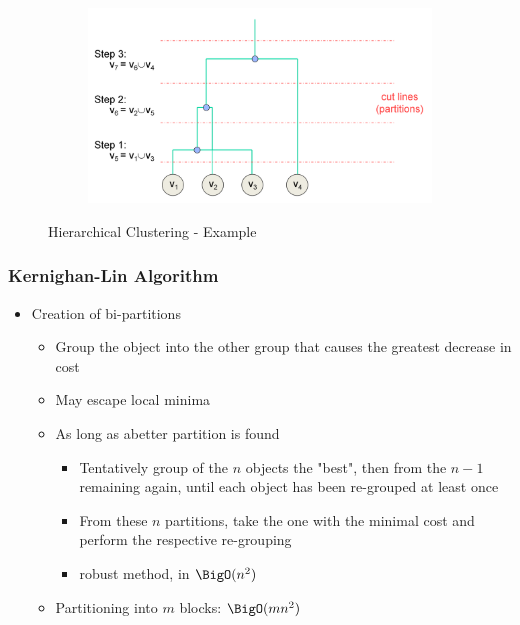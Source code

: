 \begin{figure}[h]
\begin{center}
		\hfill
		\begin{subfigure}[b]{0.45\textwidth}
			\includegraphics[width=\textwidth]{images/Hierarchical_clustering_4.png}	
		\end{subfigure}
	\end{center}
	\caption{Hierarchical Clustering - Example}
	\label{fig:hierarchical_clustering}
\end{figure}

\subsubsection{Kernighan-Lin Algorithm}
\begin{itemize}
	\item Creation of bi-partitions 
\begin{itemize}
	\item Group the object into the other group that causes the greatest decrease in cost
	\item May escape local minima
	\item As long as abetter partition is found
\begin{itemize}
	\item Tentatively group of the $n$ objects the "best", then from the $n-1$ remaining again, until each object has been re-grouped at least once
	\item From these $n$ partitions, take the one with the minimal cost and perform the respective re-grouping
	\item robust method, in $\BigO(n^2)$
\end{itemize}
	\item Partitioning into $m$ blocks: $\BigO(mn^2)$
\end{itemize}
\end{itemize}

